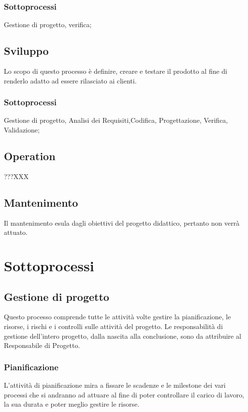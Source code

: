 \subsubsection{Sottoprocessi}
Gestione di progetto, verifica;
\subsection{Sviluppo}
Lo scopo di questo processo è definire, creare e testare il prodotto al fine di renderlo adatto ad essere rilasciato ai clienti.
\subsubsection{Sottoprocessi}
Gestione di progetto, Analisi dei Requisiti,Codifica, Progettazione, Verifica, Validazione;
\subsection{Operation}
???XXX
\subsection{Mantenimento}
Il mantenimento esula dagli obiettivi del progetto didattico, pertanto non verrà attuato.


\section{Sottoprocessi}


\subsection{Gestione di progetto}
Questo processo comprende tutte le attività volte gestire la pianificazione, le risorse, i rischi e i controlli sulle attività del progetto.
Le responsabilità di gestione dell’intero progetto, dalla nascita alla conclusione, sono da attribuire al Responsabile di Progetto.

\subsubsection{Pianificazione}
L'attività di pianificazione mira a fissare le scadenze e le milestone dei vari processi che si andranno ad attuare al fine di poter controllare il carico di lavoro, la sua durata e poter meglio gestire le risorse.

